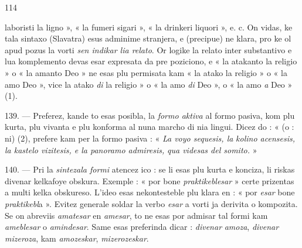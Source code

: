 \begin{VUpage}[118]{114}
\VUornement{147.14mm}

\VUcontinue
laboristi la ligno », « la fumeri sigari », « la drinkeri\nl
liquori », e. c. On vidas, ke tala sintaxo (Slavatra) esus\nl
adminime stranjera, e (precipue) ne klara, pro ke ol apud\cc
pozus la vorti \textit{sen indikar lia relato}. Or logike la relato inter\nl
substantivo e lua komplemento devas esar expresata da pre\cc
poziciono, e « la atakanto la religio » o « la amanto Deo »\nl
ne esas plu permisata kam « la atako la religio » o « la\nl
amo Deo », vice la atako \textit{di} la religio » o « la amo \textit{di} Deo »,\nl
o « la amo \textit{a} Deo » (1).

\VUblanc{5.93pt}%
139. --- Preferez, kande to esas posibla, la \textit{formo aktiva}\nl
al formo pasiva, kom plu kurta, plu vivanta e plu konforma\nl
al nuna marcho di nia lingui. Dicez do : «  (o : ni)\nl
{}\cc
{} (2),\nl
prefere kam per la formo pasiva : « \textit{La voyo sequesis, la}\nl
\textit{kolino acensesis, la kastelo vizitesis, e la panoramo admiresis,}\nl
\textit{qua videsas del somito.} »

\VUblanc{5.85pt}%
140. --- Pri la \textit{sintezala formi} atencez ico : se li esas plu\nl
kurta e konciza, li riskas divenar kelkafoye obskura.\nl
Exemple : « por bone \textit{praktikeblesar} » certe prizentas a\nl
multi kelka obskureso. L'ideo esas nekontesteble plu klara\nl
en : « por \textit{esar} bone \textit{praktikebl}a ». Evitez generale soldar\nl
la verbo \textit{esar} a vorti ja derivita o kompozita. Se on abreviis\nl
\textit{amatesar} en \textit{amesar}, to ne esas por admisar tal formi kam\nl
\textit{ameblesar} o \textit{amindesar}. Same esas preferinda dicar : \textit{divenar}\nl
\textit{amoza}, \textit{divenar mizeroza}, kam \textit{amozeskar}, \textit{mizerozeskar}.
\end{VUpage}

